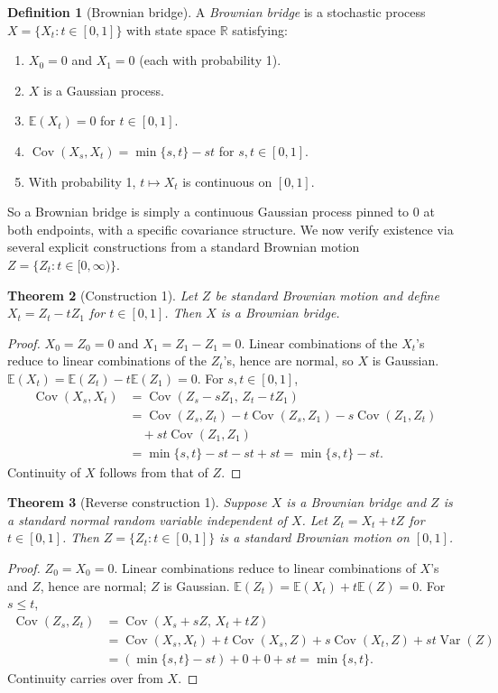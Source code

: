 \documentclass[12pt,openany]{book}
\newtheorem{theorem}{Theorem}[section]
\theoremstyle{definition}
\newtheorem{definition}[theorem]{Definition}
\theoremstyle{remark}
\newcommand{\R}{\mathbb{R}}
\newcommand{\E}{\mathbb{E}}
\DeclareMathOperator{\Var}{Var}
\DeclareMathOperator{\Cov}{Cov}
\begin{document}
\begin{definition}[Brownian bridge]
A \emph{Brownian bridge} is a stochastic process $X=\{X_t : t\in[0,1]\}$ with state space $\R$ satisfying:
\begin{enumerate}[label=(\arabic*)]
    \item $X_0=0$ and $X_1=0$ (each with probability 1).
    \item $X$ is a Gaussian process.
    \item $\E(X_t)=0$ for $t\in[0,1]$.
    \item $\Cov(X_s,X_t) = \min\{s,t\} - st$ for $s,t\in[0,1]$.
    \item With probability 1, $t\mapsto X_t$ is continuous on $[0,1]$.
\end{enumerate}
\end{definition}
 
So a Brownian bridge is simply a continuous Gaussian process pinned to $0$ at both endpoints, with a specific covariance structure. We now verify existence via several explicit constructions from a standard Brownian motion $Z = \{Z_t : t\in[0,\infty)\}$.
 
\begin{theorem}[Construction 1]
Let $Z$ be standard Brownian motion and define $X_t = Z_t - tZ_1$ for $t\in[0,1]$. Then $X$ is a Brownian bridge.
\end{theorem}
\begin{proof}
$X_0 = Z_0 = 0$ and $X_1 = Z_1-Z_1=0$. Linear combinations of the $X_t$'s reduce to linear combinations of the $Z_t$'s, hence are normal, so $X$ is Gaussian. $\E(X_t) = \E(Z_t)-t\E(Z_1) = 0$. For $s,t\in[0,1]$,
\[
    \begin{aligned}
    \Cov(X_s,X_t)
    &=\Cov(Z_s-sZ_1,\,Z_t-tZ_1)\\
    &=\Cov(Z_s,Z_t)-t\Cov(Z_s,Z_1)-s\Cov(Z_1,Z_t)\\
    &\quad+st\Cov(Z_1,Z_1)\\
    &=\min\{s,t\}-st-st+st
     =\min\{s,t\}-st.
    \end{aligned}
\]
Continuity of $X$ follows from that of $Z$.
\end{proof}
 
\begin{theorem}[Reverse construction 1]
Suppose $X$ is a Brownian bridge and $Z$ is a standard normal random variable independent of $X$. Let $Z_t = X_t + tZ$ for $t\in[0,1]$. Then $Z = \{Z_t : t\in[0,1]\}$ is a standard Brownian motion on $[0,1]$.
\end{theorem}
\begin{proof}
$Z_0=X_0=0$. Linear combinations reduce to linear combinations of $X$'s and $Z$, hence are normal; $Z$ is Gaussian. $\E(Z_t) = \E(X_t)+t\E(Z) = 0$. For $s\le t$,
\[
    \begin{aligned}
    \Cov(Z_s,Z_t)
    &=\Cov(X_s+sZ,\,X_t+tZ)\\
    &=\Cov(X_s,X_t)+t\Cov(X_s,Z)+s\Cov(X_t,Z)+st\Var(Z)\\
    &=(\min\{s,t\}-st)+0+0+st
     =\min\{s,t\}.
    \end{aligned}
\]
Continuity carries over from $X$.
\end{proof}
 
\end{document}
